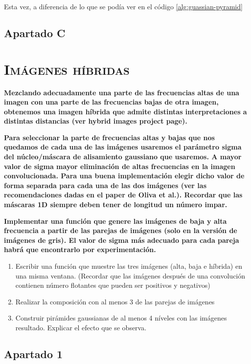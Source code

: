 \documentclass[11pt,a4paper]{article}
\begin{document}
Esta vez, a diferencia de lo que se podía ver en el código \ref{alg:guassian-pyramid}

\subsection{Apartado C}

\newpage

\section{\textsc{Imágenes híbridas}}

\noindent \textbf{Mezclando adecuadamente una parte de las frecuencias altas de una imagen con una parte de
las frecuencias bajas de otra imagen, obtenemos una imagen híbrida que admite distintas interpretaciones a distintas
distancias (ver hybrid images project page).}

\noindent \textbf{Para seleccionar la parte de frecuencias altas y bajas que nos quedamos
de cada una de las imágenes usaremos el parámetro sigma del núcleo/máscara de alisamiento gaussiano que usaremos.
A mayor valor de sigma mayor eliminación de altas frecuencias en la imagen convolucionada. Para una buena
implementación elegir dicho valor de forma separada para cada una de las dos imágenes (ver las recomendaciones
dadas en el paper de Oliva et al.). Recordar que las máscaras 1D siempre deben tener de longitud un número impar.}

\noindent \textbf{Implementar una función que genere las imágenes de baja y alta frecuencia a partir de las
parejas de imágenes (solo en la versión de imágenes de gris). El valor de sigma más adecuado para cada pareja
habrá que encontrarlo por experimentación.}

\begin{enumerate}
	\item Escribir una función que muestre las tres imágenes (alta, baja e híbrida) en una misma ventana.
	(Recordar que las imágenes después de una convolución contienen número flotantes que pueden ser positivos y negativos)
	\item Realizar la composición con al menos 3 de las parejas de imágenes
	\item Construir pirámides gaussianas de al menos 4 níveles con las imágenes resultado. Explicar el efecto que se observa.
\end{enumerate}

\subsection{Apartado 1}
\end{document}
